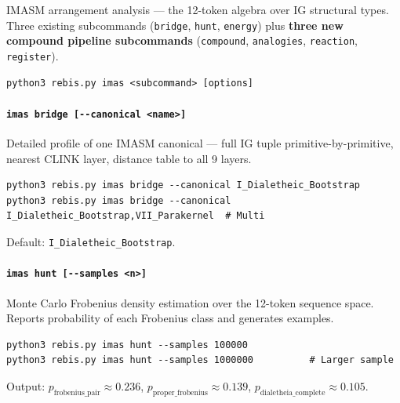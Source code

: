 IMASM arrangement analysis --- the 12-token algebra over IG structural
types. Three existing subcommands (\texttt{bridge}, \texttt{hunt},
\texttt{energy}) plus \textbf{three new compound pipeline subcommands}
(\texttt{compound}, \texttt{analogies}, \texttt{reaction},
\texttt{register}).

\begin{verbatim}
python3 rebis.py imas <subcommand> [options]
\end{verbatim}

\hypertarget{imas-bridge---canonical-name}{%
\paragraph{\texorpdfstring{\texttt{imas\ bridge\ {[}-\/-canonical\ \textless{}name\textgreater{}{]}}}{imas bridge {[}-\/-canonical \textless name\textgreater{]}}}\label{imas-bridge---canonical-name}}

Detailed profile of one IMASM canonical --- full IG tuple
primitive-by-primitive, nearest CLINK layer, distance table to all 9
layers.

\begin{verbatim}
python3 rebis.py imas bridge --canonical I_Dialetheic_Bootstrap
python3 rebis.py imas bridge --canonical I_Dialetheic_Bootstrap,VII_Parakernel  # Multi
\end{verbatim}

Default: \texttt{I\_Dialetheic\_Bootstrap}.

\hypertarget{imas-hunt---samples-n}{%
\paragraph{\texorpdfstring{\texttt{imas\ hunt\ {[}-\/-samples\ \textless{}n\textgreater{}{]}}}{imas hunt {[}-\/-samples \textless n\textgreater{]}}}\label{imas-hunt---samples-n}}

Monte Carlo Frobenius density estimation over the 12-token sequence
space. Reports probability of each Frobenius class and generates
examples.

\begin{verbatim}
python3 rebis.py imas hunt --samples 100000
python3 rebis.py imas hunt --samples 1000000          # Larger sample
\end{verbatim}

Output: \(p_{\text{frobenius\_pair}} \approx 0.236\),
\(p_{\text{proper\_frobenius}} \approx 0.139\),
\(p_{\text{dialetheia\_complete}} \approx 0.105\).

